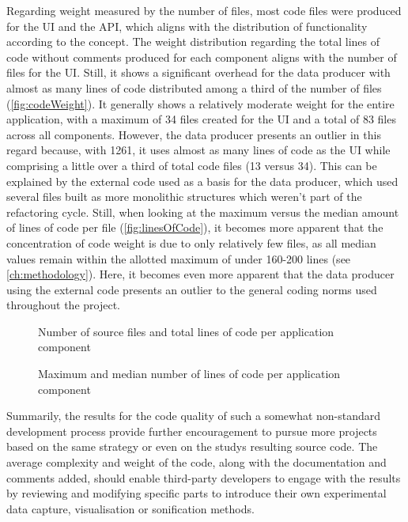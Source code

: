 Regarding weight measured by the number of files, most code files were produced for the \ac{UI} and the \ac{API}, which aligns with the distribution of functionality according to the concept.
The weight distribution regarding the total lines of code without comments produced for each component aligns with the number of files for the \ac{UI}.
Still, it shows a significant overhead for the data producer with almost as many lines of code distributed among a third of the number of files (\autoref{fig:codeWeight}).
It generally shows a relatively moderate weight for the entire application, with a maximum of 34 files created for the \ac{UI} and a total of 83 files across all components.
However, the data producer presents an outlier in this regard because, with 1261, it uses almost as many lines of code as the  \ac{UI} while comprising a little over a third of total code files (13 versus 34).
This can be explained by the external code used as a basis for the data producer, which used several files built as more monolithic structures which weren't part of the refactoring cycle.
Still, when looking at the maximum versus the median amount of lines of code per file (\autoref{fig:linesOfCode}), it becomes more apparent that the concentration of code weight is due to only relatively few files, as all median values remain within the allotted maximum of under 160-200 lines (see \autoref{ch:methodology}).
Here, it becomes even more apparent that the data producer using the external code presents an outlier to the general coding norms used throughout the project.

\begin{figure*}[!ht]
\hfill

\caption[Source file count and total lines of code]{Number of source files and total lines of code per application component\protect}
\label{fig:codeWeight}
\end{figure*}

\begin{figure}[!ht]
\centering

\caption[Lines of code per application component]{Maximum and median number of lines of code per application component\protect}
\label{fig:linesOfCode}
\end{figure}

Summarily, the results for the code quality of such a somewhat non-standard development process provide further encouragement to pursue more projects based on the same strategy or even on the study\textquotesingle s resulting source code.
The average complexity and weight of the code, along with the documentation and comments added, should enable third-party developers to engage with the results by reviewing and modifying specific parts to introduce their own experimental data capture, visualisation or sonification methods.

